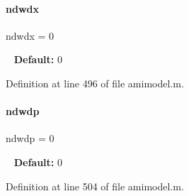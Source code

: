 \mbox{\label{classamimodel_ae6c1afb5529f1cc0ff56552f94e7a2b5}} 
\paragraph{\texorpdfstring{ndwdx}{ndwdx}}
{\footnotesize\ttfamily ndwdx = 0}

~\newline
{\bfseries{Default\+:}} 0 

Definition at line 496 of file amimodel.\+m.

\mbox{\label{classamimodel_aa8af9048cd0280059bed9ef8999ecffb}} 
\paragraph{\texorpdfstring{ndwdp}{ndwdp}}
{\footnotesize\ttfamily ndwdp = 0}

~\newline
{\bfseries{Default\+:}} 0 

Definition at line 504 of file amimodel.\+m.

